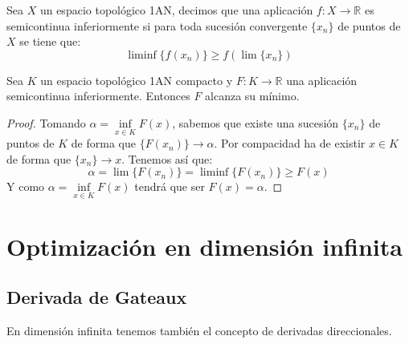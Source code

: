 \begin{definicion}
    Sea $X$ un espacio topológico 1AN, decimos que una aplicación $f:X\to \mathbb{R}$ es semicontinua inferiormente si para toda sucesión convergente $\{x_n\}$ de puntos de $X$ se tiene que:
    \begin{equation*}
        \liminf \{f(x_n)\} \geq f\left(\lim \{x_n\}\right)
    \end{equation*}
\end{definicion}

\begin{teo}
    Sea $K$ un espacio topológico 1AN compacto y $F:K\to \mathbb{R}$ una aplicación semicontinua inferiormente. Entonces $F$ alcanza su mínimo.
    \begin{proof}
        Tomando $\alpha = \inf\limits_{x\in K}F(x)$, sabemos que existe una sucesión $\{x_n\}$ de puntos de $K$ de forma que $\{F(x_n)\}\to \alpha$. Por compacidad ha de existir $x\in K$ de forma que $\{x_n\}\to x$. Tenemos así que:
        \begin{equation*}
            \alpha = \lim \{F(x_n)\} = \liminf \{F(x_n)\} \geq F(x)
        \end{equation*}
        Y como $\alpha = \inf\limits_{x\in K}F(x)$ tendrá que ser $F(x) = \alpha$.
    \end{proof}
\end{teo}

\chapter{Optimización en dimensión infinita}

\section{Derivada de Gateaux}
\noindent
En dimensión infinita tenemos también el concepto de derivadas direccionales.\\

